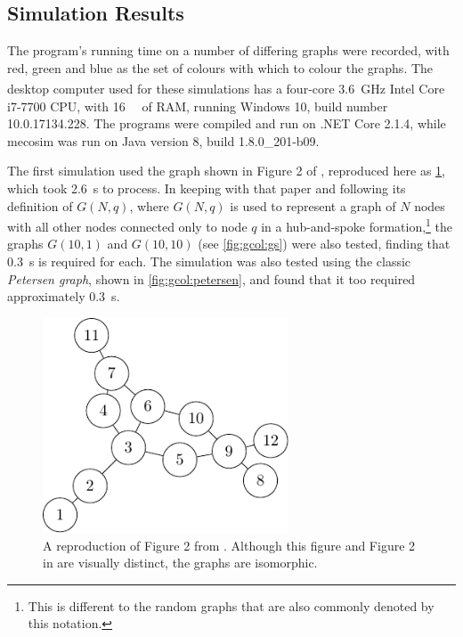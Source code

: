 \subsection{Simulation Results}
The program's running time on a number of differing graphs were recorded, with red, green and blue as the set of colours with which to colour the graphs.  The desktop computer used for these simulations has a four-core \qty{3.6}{\giga\hertz} Intel Core\textsuperscript{\textregistered} i7-7700 CPU, with \qty{16}{\gibi\byte} of RAM, running Windows 10, build number 10.0.17134.228.  The \fsharp{} programs were compiled and run on .NET Core 2.1.4, while \gls{mecosim} was run on Java version 8, build 1.8.0\_201-b09.

The first simulation used the graph shown in Figure 2 of \cite{Gheorghe2013}, reproduced here as \cref{fig:gcol:gheorghefig2}, which took \qty{2.6}{\second} to process.  In keeping with that paper and following its definition of \(G(N,q)\), where \(G(N,q)\) is used to represent a graph of \(N\) nodes with all other nodes connected only to node \(q\) in a hub-and-spoke formation,\footnote{This is different to the random graphs that are also commonly denoted by this notation.} the graphs \(G(10,1)\) and \(G(10,10)\) (see \cref{fig:gcol:gs}) were also tested, finding that \qty{0.3}{\second} is required for each.  The simulation was also tested using the classic \emph{Petersen graph}, shown in \cref{fig:gcol:petersen}, and found that it too required approximately \qty{0.3}{\second}.

\begin{figure}
    \centering
    \includegraphics[width=0.65\textwidth]{chapters/gcol/figs/gheorghe-figure-2-figure0.pdf}
    \caption[A reproduction of the graph in Figure 2 of \cite{Gheorghe2013}]{\label{fig:gcol:gheorghefig2}A reproduction of Figure 2 from \cite{Gheorghe2013}.  Although this figure and Figure 2 in \cite{Gheorghe2013} are visually distinct, the graphs are isomorphic.}
\end{figure}

